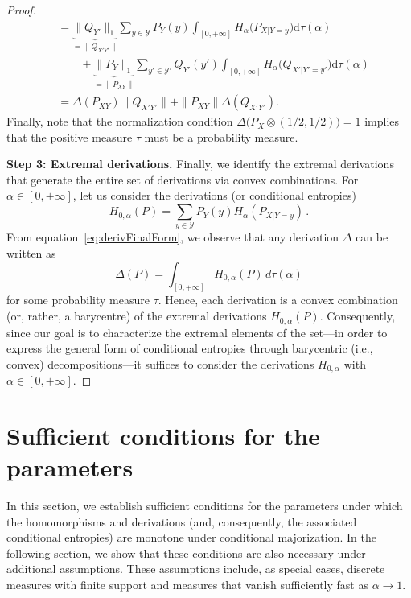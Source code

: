 \documentclass[aps,pra,11pt,onecolumn,nofootinbib,tightenlines]{revtex4-2}
\theoremstyle{definition}
\def \d {\mathrm{d}}
\newcommand{\Y}{\mathcal{Y}}
\newcommand{\mc}[1]{\mathcal{#1}}
\begin{document}
\begin{proof}
\begin{align}
&=\underbrace{\|Q_{Y'}\|_1}_{=\|Q_{X'Y'}\|}\sum_{y\in \Y}P_Y(y)\int_{[0,+\infty]}H_\alpha\big(P_{X|Y=y}\big)\d\tau(\alpha)\\
&\qquad +\underbrace{\|P_Y\|_1}_{=\|P_{XY}\|}\sum_{y'\in \Y'}Q_{Y'}(y')\int_{[0,+\infty]}H_\alpha\big(Q_{X'|Y'=y'}\big)\d\tau(\alpha)\\
&=\Delta(P_{XY})\|Q_{X'Y'}\|+\|P_{XY}\|\Delta(Q_{X'Y'}).
\end{align}
Finally, note that the normalization condition $\Delta\big(P_X\otimes(1/2,1/2)\big)=1$ implies that the positive measure $\tau$ must be a probability measure. 


\medskip
\noindent \noindent\textbf{Step 3: Extremal derivations.} Finally, we identify the extremal derivations that generate the entire set of derivations via convex combinations. For $\alpha\in[0,+\infty]$, let us consider the derivations (or conditional entropies)
\begin{equation}\label{eq:ExtDerivation proof}
H_{0,\alpha}(P)=\sum_{y\in\mc Y} P_Y(y)H_\alpha(P_{X|Y=y})\,.
\end{equation}
From equation~\eqref{eq:derivFinalForm}, we observe that any derivation \(\Delta\) can be written as
\begin{equation}
    \Delta(P) = \int_{[0,+\infty]} H_{0,\alpha}(P)\, d\tau(\alpha) 
\end{equation}
for some probability measure \(\tau\). Hence, each derivation is a convex combination (or, rather, a barycentre) of the extremal derivations \(H_{0,\alpha}(P)\). 
Consequently, since our goal is to characterize the extremal elements of the set—in order to express the general form of conditional entropies through barycentric (i.e., convex) decompositions—it suffices to consider the derivations
\(H_{0,\alpha}\) with \(\alpha \in [0,+\infty]\).
\end{proof}

\section{Sufficient conditions for the parameters}
\label{sec: sufficient conditions measure}
In this section, we establish sufficient conditions for the parameters under which the homomorphisms and derivations (and, consequently, the associated conditional entropies) are monotone under conditional majorization. In the following section, we show that these conditions are also necessary under additional assumptions. These assumptions include, as special cases, discrete measures with finite support and measures that vanish sufficiently fast as $\alpha\to 1$.
\end{document}
